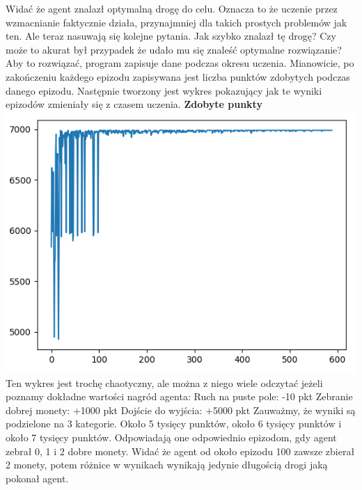 \documentclass[a4paper,12pt]{article}
\begin{document}
Widać że agent znalazł optymalną drogę do celu. Oznacza to że uczenie przez wzmacnianie faktycznie działa, przynajmniej dla takich prostych problemów jak ten. Ale teraz nasuwają się kolejne pytania. Jak szybko znalazł tę drogę? Czy może to akurat był przypadek że udało mu się znaleść optymalne rozwiązanie? Aby to rozwiązać, program zapisuje dane podczas okresu uczenia. Mianowicie, po zakończeniu każdego epizodu zapisywana jest liczba punktów zdobytych podczas danego epizodu. Następnie tworzony jest wykres pokazujący jak te wyniki epizodów zmieniały się z czasem uczenia. \newpage
\textbf{\Large{Zdobyte punkty}} \newline
\includegraphics[scale=0.9]{testy/wykres1.png}
\newline Ten wykres jest trochę chaotyczny, ale można z niego wiele odczytać jeżeli poznamy dokładne wartości nagród agenta: \newline
\newline Ruch na puste pole: -10 pkt
\newline Zebranie dobrej monety: +1000 pkt
\newline Dojście do wyjścia: +5000 pkt
\newline \newline Zauważmy, że wyniki są podzielone na 3 kategorie. Około 5 tysięcy punktów, około 6 tysięcy punktów i około 7 tysięcy punktów. Odpowiadają one odpowiednio epizodom, gdy agent zebrał 0, 1 i 2 dobre monety. Widać że agent od około epizodu 100 zawsze zbierał 2 monety, potem różnice w wynikach wynikają jedynie długością drogi jaką pokonał agent.
\newpage
\end{document}
